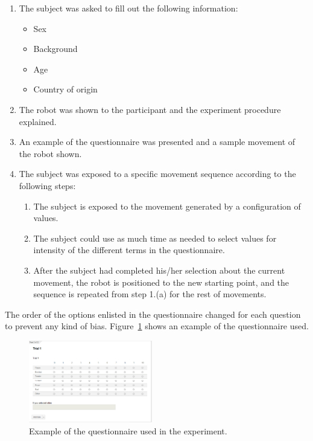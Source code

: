 \begin{enumerate}
	
	\item The subject was asked to fill out the following information:
	
	\begin{itemize}
		\item Sex
		\item Background
		\item Age
		\item Country of origin
	\end{itemize}
	
	\item The robot was shown to the participant and the experiment procedure explained.

	\item An example of the questionnaire was presented and a sample movement of the robot shown.

	\item The subject was exposed to a specific movement sequence according to the following steps:

	\begin{enumerate}

		\item The subject is exposed to the movement generated by a configuration of values.

		\item The subject could use as much time as needed to select values for intensity of the different terms in the questionnaire.

		\item After the subject had completed his/her selection about the current movement, the robot is positioned to the new starting point, and the sequence is repeated from step 1.(a) for the rest of movements.

	\end{enumerate}
\end{enumerate}

The order of the options enlisted in the questionnaire changed for each question to prevent any kind of bias. Figure~\ref{fig:questionnaire_example} shows an example of the questionnaire used. 

\begin{figure}
	\centering
	\includegraphics[width=0.48\textwidth]{./Images/example_survey.png} 
	\caption{Example of the questionnaire used in the experiment.}
	\label{fig:questionnaire_example}
\end{figure}

